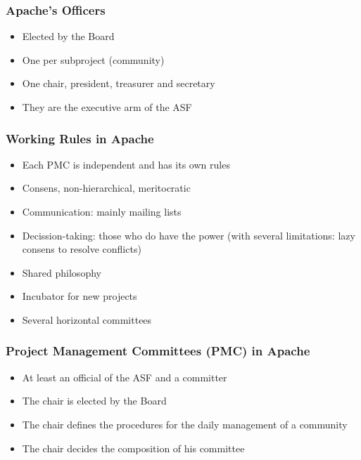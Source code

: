 \documentclass{beamer}
\begin{document}

\begin{frame}
\frametitle{Apache's Officers}

\begin{itemize}
\item Elected by the Board
\item One per subproject (community)
\item One chair, president, treasurer and secretary
\item They are the executive arm of the ASF
\end{itemize}

\end{frame}


\begin{frame}
\frametitle{Working Rules in Apache}

\begin{itemize}
\item Each PMC is independent and has its own rules
\item Consens, non-hierarchical, meritocratic
\item Communication: mainly mailing lists
\item Decission-taking: those who do have the power (with several limitations: lazy consens to resolve conflicts)
\item Shared philosophy
\item Incubator for new projects
\item Several horizontal committees
\end{itemize}

\end{frame}


\begin{frame}
\frametitle{Project Management Committees (PMC) in Apache}

\begin{itemize}
\item At least an official of the ASF and a committer
\item The chair is elected by the Board
\item The chair defines the procedures for the daily management of a community
\item The chair decides the composition of his committee
\end{itemize}

\end{frame}
\end{document}
